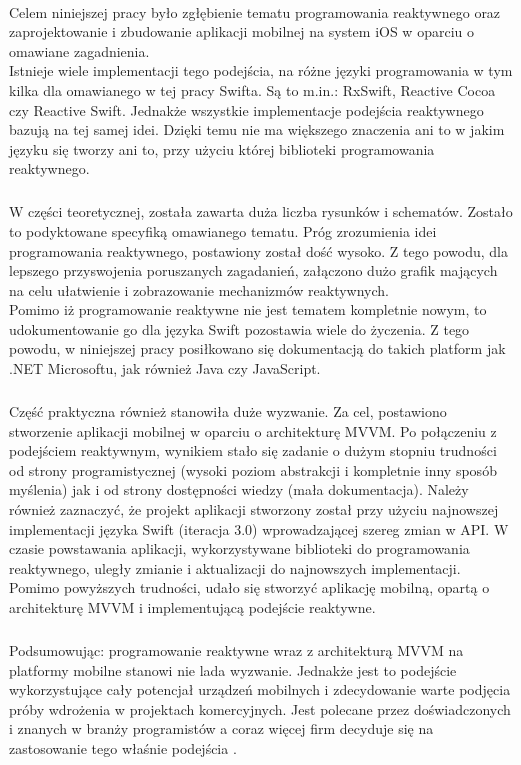\documentclass[12pt,oneside,a4paper]{report}
\begin{document}
\paragraph{}Celem niniejszej pracy było zgłębienie tematu programowania reaktywnego oraz zaprojektowanie i zbudowanie aplikacji mobilnej na system iOS w oparciu o omawiane zagadnienia.\\
Istnieje wiele implementacji tego podejścia, na różne języki programowania w tym kilka dla omawianego w tej pracy Swifta. Są to m.in.: RxSwift, Reactive Cocoa czy Reactive Swift. Jednakże wszystkie implementacje podejścia reaktywnego bazują na tej samej idei. Dzięki temu nie ma większego znaczenia ani to w jakim języku się tworzy ani to, przy użyciu której biblioteki programowania reaktywnego.
\subparagraph{}W części teoretycznej, została zawarta duża liczba rysunków i schematów. Zostało to podyktowane specyfiką omawianego tematu. Próg zrozumienia idei programowania reaktywnego, postawiony został dość wysoko. Z tego powodu, dla lepszego przyswojenia poruszanych zagadanień, załączono dużo grafik mających na celu ułatwienie i zobrazowanie mechanizmów reaktywnych.\\
Pomimo iż programowanie reaktywne nie jest tematem kompletnie nowym, to udokumentowanie go dla języka Swift pozostawia wiele do życzenia. Z tego powodu, w niniejszej pracy posiłkowano się dokumentacją do takich platform jak .NET Microsoftu, jak również Java czy JavaScript. 
\subparagraph{}Część praktyczna również stanowiła duże wyzwanie. Za cel, postawiono stworzenie aplikacji mobilnej w oparciu o architekturę MVVM. Po połączeniu z podejściem reaktywnym, wynikiem stało się zadanie o dużym stopniu trudności od strony programistycznej (wysoki poziom abstrakcji i kompletnie inny sposób myślenia) jak i od strony dostępności wiedzy (mała dokumentacja).
Należy również zaznaczyć, że projekt aplikacji stworzony został przy użyciu najnowszej implementacji języka Swift (iteracja 3.0) wprowadzającej szereg zmian w API. W czasie powstawania aplikacji, wykorzystywane biblioteki do programowania reaktywnego, uległy zmianie i aktualizacji do najnowszych implementacji.\\
Pomimo powyższych trudności, udało się stworzyć aplikację mobilną, opartą o architekturę MVVM i implementującą podejście reaktywne.
\subparagraph{}Podsumowując: programowanie reaktywne wraz z architekturą MVVM na platformy mobilne stanowi nie lada wyzwanie. Jednakże jest to podejście wykorzystujące cały potencjał urządzeń mobilnych i zdecydowanie warte podjęcia próby wdrożenia w projektach komercyjnych. Jest polecane przez doświadczonych i znanych w branży programistów a coraz więcej firm decyduje się na zastosowanie tego właśnie podejścia \cite{reactivexio}.


\begin{flushleft}

\end{flushleft}

	
\end{document}

